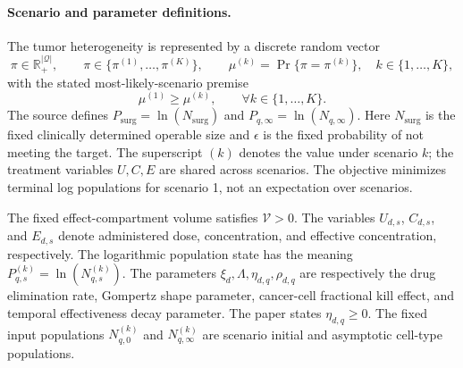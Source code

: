 \documentclass{article}
\begin{document}
\paragraph{Scenario and parameter definitions.}
The tumor heterogeneity is represented by a discrete random vector
\[
\pi\in\mathbb R_+^{|\mathcal Q|},\qquad
\pi\in\{\pi^{(1)},\ldots,\pi^{(K)}\},\qquad
\mu^{(k)}=\Pr\{\pi=\pi^{(k)}\},\quad k\in\{1,\ldots,K\},
\]
with the stated most-likely-scenario premise
\[
\mu^{(1)}\geq\mu^{(k)},\qquad \forall k\in\{1,\ldots,K\}.
\]
The source defines $P_{\mathrm{surg}}=\ln(N_{\mathrm{surg}})$ and $P_{q,\infty}=\ln(N_{q,\infty})$. Here $N_{\mathrm{surg}}$ is the fixed clinically determined operable size and $\epsilon$ is the fixed probability of not meeting the target. The superscript $(k)$ denotes the value under scenario $k$; the treatment variables $U,C,E$ are shared across scenarios. The objective minimizes terminal log populations for scenario 1, not an expectation over scenarios.

The fixed effect-compartment volume satisfies $\mathcal V>0$. The variables $U_{d,s}$, $C_{d,s}$, and $E_{d,s}$ denote administered dose, concentration, and effective concentration, respectively. The logarithmic population state has the meaning $P_{q,s}^{(k)}=\ln(N_{q,s}^{(k)})$. The parameters $\xi_d,\Lambda,\eta_{d,q},\rho_{d,q}$ are respectively the drug elimination rate, Gompertz shape parameter, cancer-cell fractional kill effect, and temporal effectiveness decay parameter. The paper states $\eta_{d,q}\geq0$. The fixed input populations $N_{q,0}^{(k)}$ and $N_{q,\infty}^{(k)}$ are scenario initial and asymptotic cell-type populations.
\end{document}

